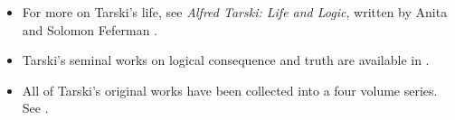 \documentclass[../../../include/open-logic-section]{subfiles}
\begin{document}
\begin{reading} 
\begin{itemize} 
\item For more on Tarski's life, see
\emph{Alfred Tarski: Life and Logic}, written by Anita and Solomon Feferman
\citep{feferman2004}.

\item Tarski's seminal works on logical consequence and truth are available
in \citet{tarski1983}.

\item All of Tarski's original works have been collected into a four volume
series. See \citet{Tarski1981}. 
\end{itemize} 
\end{reading}
\end{document}
